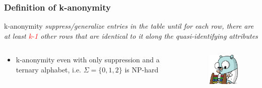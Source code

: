 \begin{frame}
  \frametitle{Definition of k-anonymity}
  \begin{block}{k-anonymity}
    \textit{suppress/generalize entries in the table until for each row, there are at least \textcolor{red}{k-1} other rows that are identical to it along the quasi-identifying attributes}
  \end{block}
  \begin{columns}
    \begin{block}{}
      \begin{itemize}
        \item{k-anonymity even with only suppression and a ternary alphabet, i.e. \(\Sigma = \{0, 1, 2\}\) is NP-hard~\cite{aggarwal} }
      \end{itemize}
    \end{block}
    \begin{figure}
      \includegraphics[width=100px]{../images/gopher-calc.png}
    \end{figure}
  \end{columns}
\end{frame}
